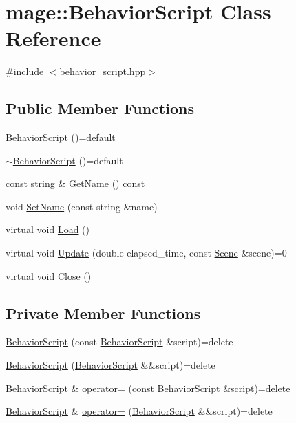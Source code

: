 \hypertarget{classmage_1_1_behavior_script}{}\section{mage\+:\+:Behavior\+Script Class Reference}
\label{classmage_1_1_behavior_script}


{\ttfamily \#include $<$behavior\+\_\+script.\+hpp$>$}

\subsection*{Public Member Functions}
\begin{DoxyCompactItemize}
\item 
\hyperlink{classmage_1_1_behavior_script_a90ac6d3397f54ad95a931c9ef2c47549}{Behavior\+Script} ()=default
\item 
\hyperlink{classmage_1_1_behavior_script_a1cc4b4f909124615af4f49f2327c233e}{$\sim$\+Behavior\+Script} ()=default
\item 
const string \& \hyperlink{classmage_1_1_behavior_script_a06179af26e24991b5083a5b1d603bc93}{Get\+Name} () const
\item 
void \hyperlink{classmage_1_1_behavior_script_a04d2a39a204b9314b1f4b01ad3a93021}{Set\+Name} (const string \&name)
\item 
virtual void \hyperlink{classmage_1_1_behavior_script_a9b2954891ee98dcef926b1db42674ce3}{Load} ()
\item 
virtual void \hyperlink{classmage_1_1_behavior_script_ac5dcb11634d0d37957d3fe91ee4b1524}{Update} (double elapsed\+\_\+time, const \hyperlink{classmage_1_1_scene}{Scene} \&scene)=0
\item 
virtual void \hyperlink{classmage_1_1_behavior_script_a58397c708ec04ca09983bb20cfc0afbe}{Close} ()
\end{DoxyCompactItemize}
\subsection*{Private Member Functions}
\begin{DoxyCompactItemize}
\item 
\hyperlink{classmage_1_1_behavior_script_a776701dc960610d3a08679bc01e1def5}{Behavior\+Script} (const \hyperlink{classmage_1_1_behavior_script}{Behavior\+Script} \&script)=delete
\item 
\hyperlink{classmage_1_1_behavior_script_abec49e419345fbcdeba047d21a390416}{Behavior\+Script} (\hyperlink{classmage_1_1_behavior_script}{Behavior\+Script} \&\&script)=delete
\item 
\hyperlink{classmage_1_1_behavior_script}{Behavior\+Script} \& \hyperlink{classmage_1_1_behavior_script_a0b3327ebf7009e668a7022d254cb1d51}{operator=} (const \hyperlink{classmage_1_1_behavior_script}{Behavior\+Script} \&script)=delete
\item 
\hyperlink{classmage_1_1_behavior_script}{Behavior\+Script} \& \hyperlink{classmage_1_1_behavior_script_a528c2bd218f2e6bb7d0a8ee50a05bf01}{operator=} (\hyperlink{classmage_1_1_behavior_script}{Behavior\+Script} \&\&script)=delete
\end{DoxyCompactItemize}
